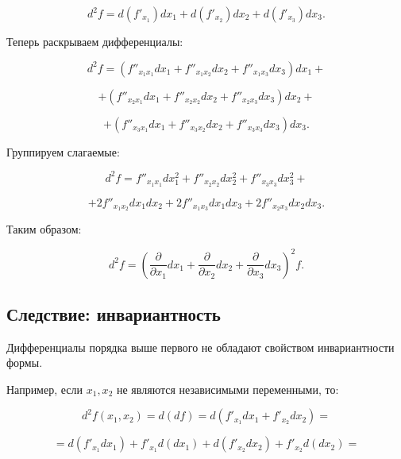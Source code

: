 {\[
d^2 f = d \left( f'_{x_1} \right) dx_1 + d \left( f'_{x_2} \right) dx_2 + d \left( f'_{x_3} \right) dx_3.
\]



Теперь раскрываем дифференциалы:



\[
d^2 f = \left( f''_{x_1 x_1} dx_1 + f''_{x_1 x_2} dx_2 + f''_{x_1 x_3} dx_3 \right) dx_1 +
\]





\[
+ \left( f''_{x_2 x_1} dx_1 + f''_{x_2 x_2} dx_2 + f''_{x_2 x_3} dx_3 \right) dx_2 +
\]





\[
+ \left( f''_{x_3 x_1} dx_1 + f''_{x_3 x_2} dx_2 + f''_{x_3 x_3} dx_3 \right) dx_3.
\]



Группируем слагаемые:



\[
d^2 f = f''_{x_1 x_1} dx_1^2 + f''_{x_2 x_2} dx_2^2 + f''_{x_3 x_3} dx_3^2 +
\]





\[
+ 2 f''_{x_1 x_2} dx_1 dx_2 + 2 f''_{x_1 x_3} dx_1 dx_3 + 2 f''_{x_2 x_3} dx_2 dx_3.
\]



Таким образом:



\[
d^2 f = \left( \frac{\partial}{\partial x_1} dx_1 + \frac{\partial}{\partial x_2} dx_2 + \frac{\partial}{\partial x_3} dx_3 \right)^2 f.
\]


\subsection*{Следствие: инвариантность}

Дифференциалы порядка выше первого не обладают свойством инвариантности формы.

Например, если \( x_1, x_2 \) не являются независимыми переменными, то:



\[
d^2 f(x_1, x_2) = d (df) = d \left( f'_{x_1} dx_1 + f'_{x_2} dx_2 \right) =
\]





\[
= d \left( f'_{x_1} dx_1 \right) + f'_{x_1} d (dx_1) + d \left( f'_{x_2} dx_2 \right) + f'_{x_2} d (dx_2) =
\]





}
